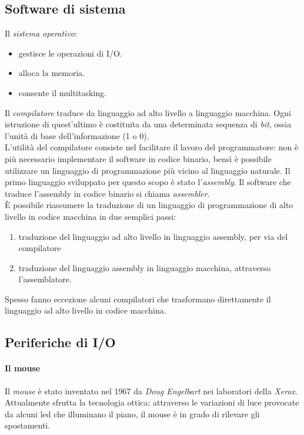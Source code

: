 \documentclass[class=book, crop=false]{standalone}
\begin{document}
\subsection{Software di sistema}
Il \emph{sistema operativo}:
\begin{itemize}[noitemsep]
	\item gestisce le operazioni di I/O.
	\item alloca la memoria.
	\item consente il multitasking.
\end{itemize}
Il \emph{compilatore} traduce da linguaggio ad alto livello a linguaggio macchina. Ogni istruzione di quest'ultimo è costituita da una determinata sequenza di \emph{bit}, ossia l'unità di base dell'informazione (1 o 0).\\
L'utilità del compilatore consiste nel facilitare il lavoro del programmatore: non è più necessario implementare il software in codice binario, bensì è possibile utilizzare un linguaggio di programmazione più vicino al linguaggio naturale. Il primo linguaggio sviluppato per questo scopo è stato l'\emph{assembly}. Il software che traduce l'assembly in codice binario si chiama \emph{assembler}.\\
\`{E} possibile riassumere la traduzione di un linguaggio di programmazione di alto livello in codice macchina in due semplici passi:
\begin{enumerate}[noitemsep]
	\item traduzione del linguaggio ad alto livello in linguaggio assembly, per via del compilatore
	\item traduzione del linguaggio assembly in linguaggio macchina, attraverso l'assemblatore.
\end{enumerate}
Spesso fanno eccezione alcuni compilatori che trasformano direttamente il linguaggio ad alto livello in codice macchina.

\subsection{Periferiche di I/O}

\paragraph{Il mouse}
Il \emph{mouse} è stato inventato nel 1967 da \emph{Doug Engelbart} nei laboratori della \emph{Xerox}. Attualmente sfrutta la tecnologia ottica: attraverso le variazioni di luce provocate da alcuni led che illuminano il piano, il mouse è in grado di rilevare gli spostamenti.
\end{document}
